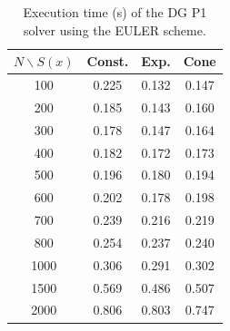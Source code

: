 \begin{table}[h!]
\centering
\begin{tabular}{c ccc}
\hline
$N \backslash S(x)$ & Const. & Exp. & Cone \\
\hline
100 & 0.225 & 0.132 & 0.147 \\
200 & 0.185 & 0.143 & 0.160 \\
300 & 0.178 & 0.147 & 0.164 \\
400 & 0.182 & 0.172 & 0.173 \\
500 & 0.196 & 0.180 & 0.194 \\
600 & 0.202 & 0.178 & 0.198 \\
700 & 0.239 & 0.216 & 0.219 \\
800 & 0.254 & 0.237 & 0.240 \\
1000 & 0.306 & 0.291 & 0.302 \\
1500 & 0.569 & 0.486 & 0.507 \\
2000 & 0.806 & 0.803 & 0.747 \\
\hline
\end{tabular}
\caption{Execution time (s) of the DG P1 solver using the EULER scheme.}
\label{tab:performance-euler}
\end{table}
